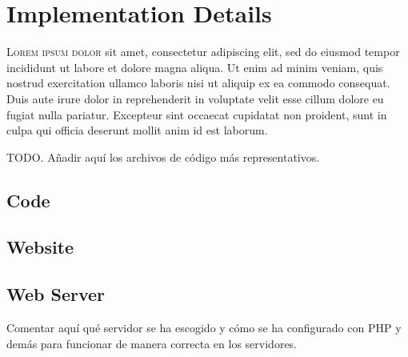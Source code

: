 

\chapter{Implementation Details}\label{cha:code}



\lettrine{L}{orem ipsum dolor} sit amet, consectetur adipiscing elit, sed do
eiusmod tempor incididunt ut labore et dolore magna aliqua. Ut enim ad minim
veniam, quis nostrud exercitation ullamco laboris nisi ut aliquip ex ea commodo
consequat. Duis aute irure dolor in reprehenderit in voluptate velit esse
cillum dolore eu fugiat nulla pariatur. Excepteur sint occaecat cupidatat non
proident, sunt in culpa qui officia deserunt mollit anim id est laborum.


TODO. Añadir aquí los archivos de código más representativos.




\section{Code}


\section{Website}



\section{Web Server}
Comentar aquí qué servidor se ha escogido y cómo se ha configurado con PHP y
demás para funcionar de manera correcta en los servidores.
